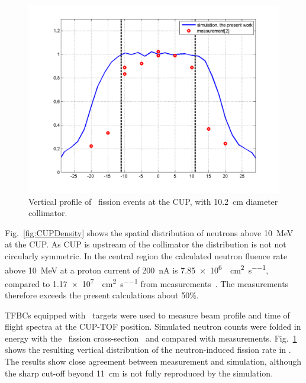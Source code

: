 \documentclass[peerreviewca,11pt,a4paper]{IEEEtran}
\let\MYoriglatexcaption\caption
\renewcommand{\caption}[2][\relax]{\MYoriglatexcaption[#2]{#2}}
\def\U238{\BPChem{\^{238}U}}
\begin{document}
\begin{figure}[!t]
    \centering
    \includegraphics[width=0.9\columnwidth]{CUPTOF10beamproRADECS.png}
    \caption{
        Vertical profile of \U238\ fission events at the CUP, with \SI{10.2}{\cm} diameter collimator. }
    \label{fig:CUPProfile}
\end{figure}

Fig.~\ref{fig:CUPDensity} shows the spatial distribution of neutrons above \SI{10}{\MeV} at the CUP.
As CUP is upstream of the collimator the distribution is not not circularly symmetric.
In the central region the calculated neutron fluence rate above \SI{10}{\MeV} at a proton current of \SI{200}{\nA} is \SI{7.85e6}{\neutron\per\cm\squared\per\second}, compared to \SI{1.17e7}{\neutron\per\cm\squared\per\second} from measurements~\cite{Prokofiev2014}.
The measurements therefore exceeds the present calculations about 50\%.

TFBCs equipped with \U238\ targets were used to measure beam profile and time of flight spectra at the CUP-TOF position.
Simulated neutron counts were folded in energy with the \U238\ fission cross-section~\cite{Carlson2009} and compared with measurements.
Fig.~\ref{fig:CUPProfile} shows the resulting vertical distribution of the neutron-induced fission rate in \U238.
The results show close agreement between measurement and simulation, although the sharp cut-off beyond \SI{11}{\cm} is not fully reproduced by the simulation.%
\end{document}
